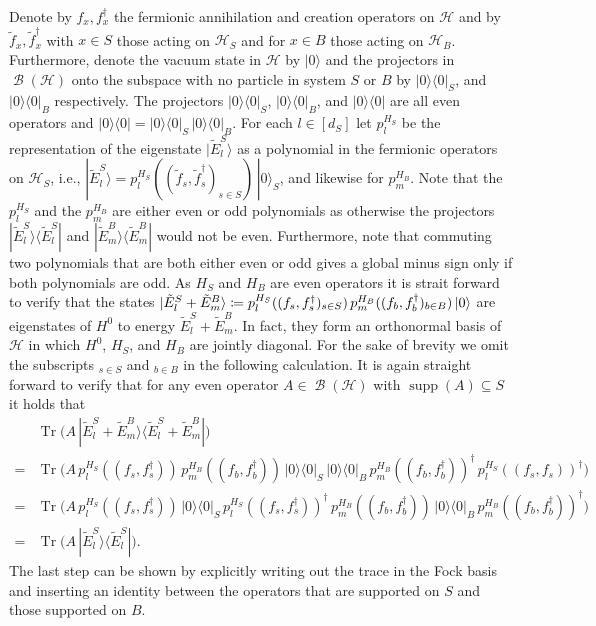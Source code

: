 \documentclass[a4paper,12pt,listof=totoc,index=totoc,bibliography=totoc,headsepline=false,headings=normal,BCOR16.153846mm,DIV12,headinclude,twoside,cleardoublepage=empty,numbers=noenddot,final]{scrreprt}
\theoremstyle{mystyle}
\numberwithin{equation}{section}
\numberwithin{figure}{section}
\numberwithin{lemma}{section}
\numberwithin{theorem}{section}
\numberwithin{corollary}{section}
\numberwithin{definition}{section}
\numberwithin{conjecture}{section}
\numberwithin{observation}{section}
\newcommand{\+}{\mkern2mu}
\newcommand{\coloneqq}{\mathrel{\vcentcolon\mkern-1.2mu=}} %
\renewcommand{\H}{H}
\newcommand{\bra}[1]{\langle #1|}
\newcommand{\ket}[1]{|#1\rangle}
\newcommand{\ketbra}[2]{\ket{#1}\!\bra{#2}}
\newcommand{\ad}{^\dagger}
\DeclareMathOperator{\1}{\mathds{1}}
\DeclareMathOperator{\Bop}{\mathcal{B}}
\DeclareMathOperator{\Tr}{Tr}
\DeclareMathOperator{\supp}{supp}
\newcommand{\mc}[1]{\mathcal{#1}}
\newcommand{\mcH}{\mc{H}}
\begin{document}
Denote by $f_x,f\ad_x$ the fermionic annihilation and creation operators on $\mcH$ and by $\tilde f_x, \tilde f\ad_x$ with $x \in S$ those acting on $\mcH_S$ and for $x \in B$ those acting on $\mcH_B$.
Furthermore, denote the vacuum state in $\mcH$ by $\ket{0}$ and the projectors in $\Bop(\mcH)$ onto the subspace with no particle in system $S$ or $B$ by $\ketbra{0}{0}_S$, and $\ketbra{0}{0}_B$ respectively.
The projectors $\ketbra{0}{0}_S$, $\ketbra{0}{0}_B$, and $\ketbra{0}{0}$ are all even operators and $\ketbra{0}{0} = \ketbra{0}{0}_S\,\ketbra{0}{0}_B$.
For each $l \in [d_S]$ let $p^{\H_S}_l$ be the representation of the eigenstate $\ket{\tilde E^S_l}$ as a polynomial in the fermionic operators on $\mcH_S$, i.e., $\ket{\tilde E^S_l} = p^{\H_S}_l((\tilde f_s,\tilde f\ad_s)_{s\in S})\,\ket{0}_S$, and likewise for $p^{\H_B}_m$.
Note that the $p^{\H_S}_l$ and the $p^{\H_B}_m$ are either even or odd polynomials as otherwise the projectors $\ketbra{\tilde E^S_l}{\tilde E^S_l}$ and $\ketbra{\tilde E^B_m}{\tilde E^B_m}$ would not be even.
Furthermore, note that commuting two polynomials that are both either even or odd gives a global minus sign only if both polynomials are odd.
As $\H_S$ and $\H_B$ are even operators it is strait forward to verify that the states $\ket{\tilde E^S_l + \tilde E^B_m} \coloneqq p^{\H_S}_l((f_s,f\ad_s)_{s\in S})\,p^{\H_B}_m((f_b,f\ad_b)_{b\in B})\,\ket{0}$ are eigenstates of $\H^0$ to energy $\tilde E^S_l + \tilde E^B_m$.
In fact, they form an orthonormal basis of $\mcH$ in which $\H^0$, $\H_S$, and $\H_B$ are jointly diagonal.
For the sake of brevity we omit the subscripts $_{s\in S}$ and $_{b\in B}$ in the following calculation.
It is again straight forward to verify that for any even operator $A \in \Bop(\mcH)$ with $\supp(A) \subseteq S$ it holds that
\begin{align}
  &\Tr\big(A\,\ketbra{\tilde E^S_l + \tilde E^B_m}{\tilde E^S_l + \tilde E^B_m}\big) \\
  = &\Tr\big(A\, p^{\H_S}_l((f_s,f\ad_s))\,p^{\H_B}_m((f_b,f\ad_b))\,\ketbra{0}{0}_S\,\ketbra{0}{0}_B\,p^{\H_B}_m((f_b,f\ad_b))\ad\,p^{\H_S}_l((f_s,f_s))\ad \big) \nonumber \\
  = &\Tr\big(A\, p^{\H_S}_l((f_s,f\ad_s))\,\ketbra{0}{0}_S\,p^{\H_S}_l((f_s,f\ad_s))\ad\,p^{\H_B}_m((f_b,f\ad_b))\,\ketbra{0}{0}_B\,p^{\H_B}_m((f_b,f\ad_b))\ad \big) \nonumber \\ 
  = &\Tr\big(A\,\ketbra{\tilde E^S_l}{\tilde E^S_l} \big) .
\end{align}
The last step can be shown by explicitly writing out the trace in the Fock basis and inserting an identity between the operators that are supported on $S$ and those supported on $B$.
\end{document}
